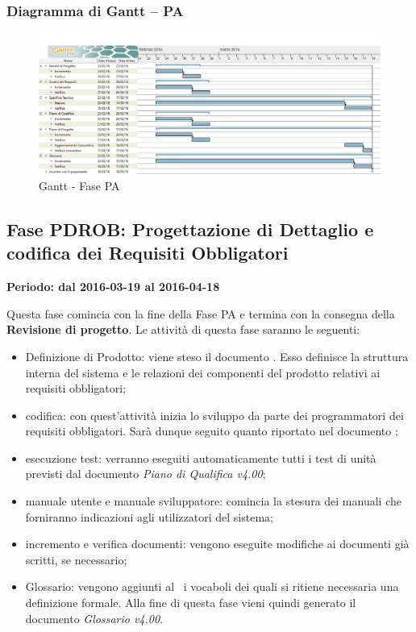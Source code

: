 \documentclass[../PianoProgetto.tex]{subfiles}
\begin{document}
		\subsubsection{Diagramma di Gantt – PA}
			\begin{figure}[!h]
				\centering
				\includegraphics[width=\textwidth]{gantt_png/3-progettazione_architetturale}
				\caption{Gantt - Fase PA}
				\label{fig:Gantt - Fase PA}
			\end{figure}
			
	\subsection{Fase PDROB: Progettazione di Dettaglio e codifica dei Requisiti Obbligatori}
		\textbf{Periodo: dal 2016-03-19 al 2016-04-18}
		
		Questa fase comincia con la fine della Fase PA e termina con la consegna della \textbf{Revisione di progetto}. Le attività di questa fase saranno le seguenti:
		\begin{itemize}
			\item Definizione di Prodotto: viene steso il documento  . Esso definisce la struttura interna del sistema e le relazioni dei componenti del prodotto relativi ai requisiti obbligatori;

			\item codifica: con quest'attività inizia lo sviluppo da parte dei programmatori dei requisiti obbligatori. Sarà dunque seguito quanto riportato nel documento  ;

			\item esecuzione test: verranno eseguiti automaticamente tutti i test di unità previsti dal documento \textit{Piano di Qualifica v4.00};

			\item manuale utente e manuale sviluppatore: comincia la stesura dei manuali che forniranno indicazioni agli utilizzatori del sistema;

			\item incremento e verifica documenti: vengono eseguite modifiche ai documenti già scritti, se necessario;

			\item Glossario: vengono aggiunti al \glossario\ i vocaboli dei quali si ritiene necessaria una definizione formale. Alla fine di questa fase vieni quindi generato il documento \textit{Glossario v4.00}.
		\end{itemize}
\end{document}
